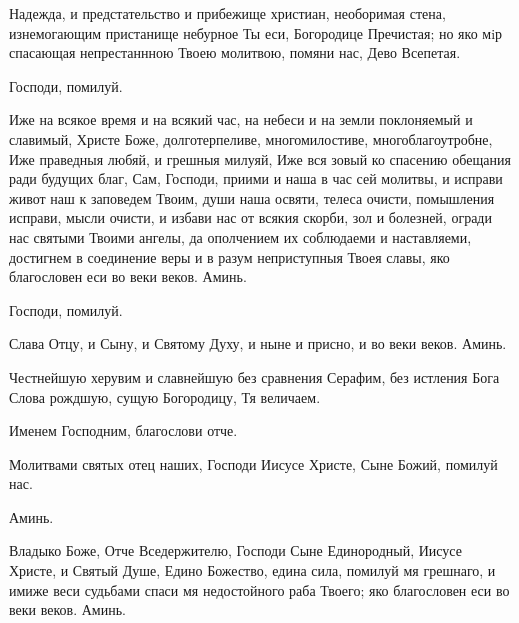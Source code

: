 \begin{mymulticols}
\inynen

Надежда, и предстательство и прибежище христиан, необоримая стена, изнемогающим пристанище небурное Ты еси, Богородице Пречистая; но яко мiр спасающая непрестаннною Твоею молитвою, помяни нас, Дево Всепетая.\myemph{]}

Господи, помилуй. 

Иже на всякое время и на всякий час, на небеси и на земли поклоняемый и славимый, Христе Боже, долготерпеливе, многомилостиве, многоблагоутробне, Иже праведныя любяй, и грешныя милуяй, Иже вся зовый ко спасению обещания ради будущих благ, Сам, Господи, приими и наша в час сей молитвы, и исправи живот наш к заповедем Твоим, души наша освяти, телеса очисти, помышления исправи, мысли очисти, и избави нас от всякия скорби, зол и болезней, огради нас святыми Твоими ангелы, да ополчением их соблюдаеми и наставляеми, достигнем в соединение веры и в разум неприступныя Твоея славы, яко благословен еси во веки веков. Аминь.

Господи, помилуй. 

Слава Отцу, и Сыну, и Святому Духу, и ныне и присно, и во веки веков. Аминь.

Честнейшую херувим и славнейшую без сравнения Серафим, без истления Бога Слова рождшую, сущую Богородицу, Тя величаем.

Именем Господним, благослови отче.

 Молитвами святых отец наших, Господи Иисусе Христе, Сыне Божий, помилуй нас.

 Аминь.



Владыко Боже, Отче Вседержителю, Господи Сыне Единородный, Иисусе Христе, и Святый Душе, Едино Божество, едина сила, помилуй мя грешнаго, и имиже веси судьбами спаси мя недостойного раба Твоего; яко благословен еси во веки веков. Аминь.


\end{mymulticols}

\mychapterending



